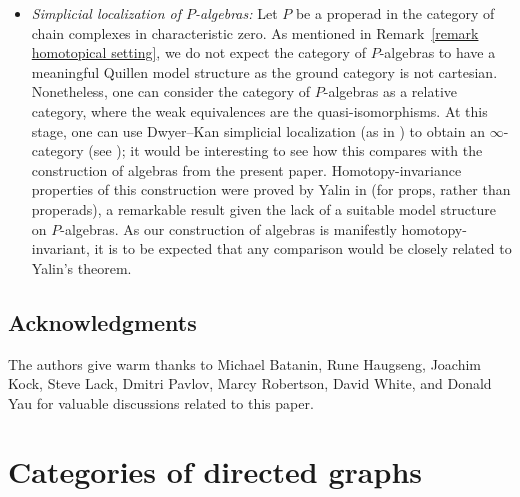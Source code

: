 \documentclass{amsart}
\numberwithin{theorem}{subsection}
\theoremstyle{definition}
\begin{document}
\begin{itemize}[leftmargin=*]
\item \emph{Simplicial localization of $P$-algebras:} Let $P$ be a properad in the category of chain complexes in characteristic zero.
As mentioned in Remark~\ref{remark homotopical setting}, we do not expect the category of $P$-algebras to have a meaningful Quillen model structure as the ground category is not cartesian.
Nonetheless, one can consider the category of $P$-algebras as a relative category, where the weak equivalences are the quasi-isomorphisms.
At this stage, one can use Dwyer--Kan simplicial localization (as in \cite{DwyerKan:SLC}) to obtain an $\infty$-category (see \cite[6.10]{BarwickKan:RCAMHTHT}); it would be interesting to see how this compares with the construction of algebras from the present paper.
Homotopy-invariance properties of this construction were proved by Yalin in \cite{Yalin:SLHAOP} (for props, rather than properads), a remarkable result given the lack of a suitable model structure on $P$-algebras. 
As our construction of algebras is manifestly homotopy-invariant, it is to be expected that any comparison would be closely related to Yalin's theorem.
\end{itemize}

\subsection*{Acknowledgments}
The authors give warm thanks to Michael Batanin, Rune Haugseng, Joachim Kock, Steve Lack, Dmitri Pavlov, Marcy Robertson, David White, and Donald Yau for valuable discussions related to this paper.

\section{Categories of directed graphs}\label{section categories of directed graphs}
\end{document}
